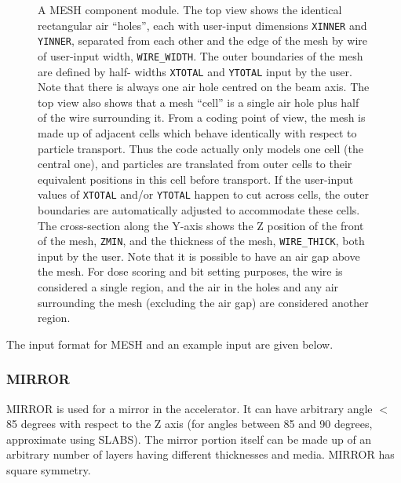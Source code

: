 \documentclass[12pt,twoside]{article}
\begin{document}
\begin{figure}[H]
\begin{center}
\begin{htmlonly}
\end{htmlonly}
\end{center}
\vspace*{-0.5cm}
\caption[MESH CM geometry]
{A MESH component module.  The top view shows the identical rectangular
air ``holes'',
each with user-input dimensions {\tt XINNER} and {\tt YINNER}, separated
from each other and the edge of the mesh by wire of user-input width,
{\tt WIRE\_WIDTH}.  The outer boundaries of the mesh are defined by half-
widths {\tt XTOTAL} and {\tt YTOTAL} input by the user.  Note that
there is always one air hole centred on the beam axis.  The top view
also shows that a mesh ``cell'' is a single air hole plus half of
the wire surrounding it.  From a coding point of view, the mesh
is made up of adjacent cells which behave identically with respect to
particle transport.  Thus the code actually only models one cell (the
central one), and particles are translated from outer cells to their
equivalent positions in this cell before transport.  If the user-input
values of {\tt XTOTAL} and/or {\tt YTOTAL} happen to cut across cells,
the outer boundaries are automatically adjusted to accommodate these
cells.  The cross-section along the Y-axis shows the
Z position of the front of the mesh, {\tt ZMIN}, and the thickness of
the mesh, {\tt WIRE\_THICK}, both input by the user.  Note that it is
possible to have an air gap above the mesh.  For dose scoring and bit
setting purposes, the wire is considered a single region, and the air
in the holes and any air surrounding the mesh (excluding the air gap) are
considered another region.}
\label{fig_MESHD}
\end{figure}

\clearpage

The input format for MESH and an example input are given below.
\begin{small}

\end{small}


\clearpage

\subsubsection{MIRROR}
\renewcommand{\rightmark}{MIRROR CM}

MIRROR is used for a mirror in the accelerator. It can have arbitrary
angle $<$ 85 degrees with respect to the Z axis (for angles between
85 and 90 degrees, approximate using SLABS).  The mirror portion itself can be
made up of an arbitrary
number
of layers having different thicknesses and media.  MIRROR has square symmetry.
\end{document}
